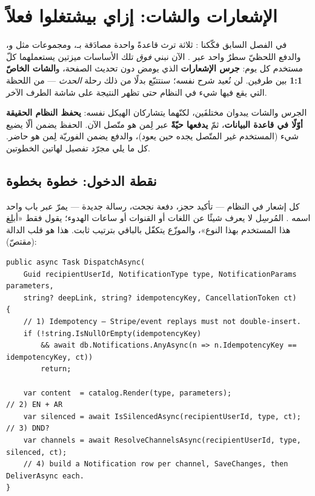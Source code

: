 \section{الإشعارات والشات: إزاي بيشتغلوا فعلاً}

في الفصل السابق فكّكنا : ثلاثة  ترث قاعدةً واحدة مصادَقة
بـ، ومجموعات مثل  و، والدفع اللحظيّ
سطرٌ واحد عبر . الآن نبني \emph{فوق} تلك الأساسات ميزتين
يستعملهما كلّ مستخدم كل يوم: \textbf{جرس الإشعارات} الذي يومض دون تحديث الصفحة،
و\textbf{الشات الخاصّ 1:1} بين طرفين. لن نُعيد شرح  نفسه؛ سنتتبّع
بدلًا من ذلك رحلة \emph{الحدث} — من اللحظة التي يقع فيها شيء في النظام حتى تظهر
النتيجة على شاشة الطرف الآخر.

\begin{idea}
الجرس والشات يبدوان مختلفَين، لكنّهما يتشاركان الهيكل نفسه: \textbf{يحفظ النظام
الحقيقة أوّلًا في قاعدة البيانات}، ثمّ \textbf{يدفعها حيّةً} عبر  لِمن
هو متّصل الآن. الحفظ يضمن ألّا يضيع شيء (المستخدم غير المتّصل يجده حين يعود)،
والدفع يضمن الفوريّة لِمن هو حاضر. كل ما يلي مجرّد تفصيل لهاتين الخطوتين.
\end{idea}

\subsection{نقطة الدخول:  خطوة بخطوة}

كل إشعار في النظام — تأكيد حجز، دفعة نجحت، رسالة جديدة — يمرّ عبر باب واحد اسمه
. المُرسِل لا يعرف شيئًا عن اللغات أو
القنوات أو ساعات الهدوء؛ يقول فقط «أبلِغ هذا المستخدم بهذا النوع»، والموزّع يتكفّل
بالباقي بترتيب ثابت. هذا هو قلب الدالة (مقتصّ):

\begin{english}
\begin{lstlisting}[language={[Sharp]C}]
public async Task DispatchAsync(
    Guid recipientUserId, NotificationType type, NotificationParams parameters,
    string? deepLink, string? idempotencyKey, CancellationToken ct)
{
    // 1) Idempotency — Stripe/event replays must not double-insert.
    if (!string.IsNullOrEmpty(idempotencyKey)
        && await db.Notifications.AnyAsync(n => n.IdempotencyKey == idempotencyKey, ct))
        return;

    var content  = catalog.Render(type, parameters);                  // 2) EN + AR
    var silenced = await IsSilencedAsync(recipientUserId, type, ct);   // 3) DND?
    var channels = await ResolveChannelsAsync(recipientUserId, type, silenced, ct);
    // 4) build a Notification row per channel, SaveChanges, then DeliverAsync each.
}
\end{lstlisting}
\end{english}

